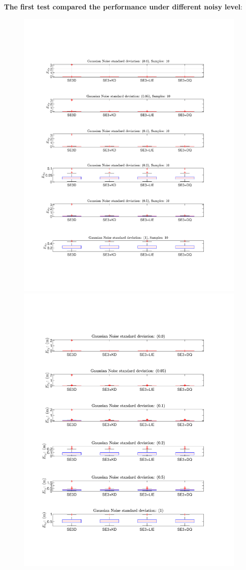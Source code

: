 \documentclass[a4paper]{report}
\begin{document}
\textbf{The first test compared the performance under different noisy level}:
\begin{figure}
\centering
\includegraphics[scale=0.4]{./hand_eye_figures/se3/r_vs_noise}
\includegraphics[scale=0.4]{./hand_eye_figures/se3/t_vs_noise}

\end{figure}
\end{document}

